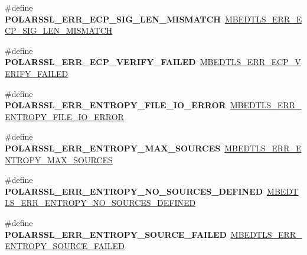 \begin{DoxyCompactItemize}
\item 
\mbox{\label{compat-1_83_8h_a1d2b0f995bf076c5ce5bbc7deb94150c}} 
\#define {\bfseries P\+O\+L\+A\+R\+S\+S\+L\+\_\+\+E\+R\+R\+\_\+\+E\+C\+P\+\_\+\+S\+I\+G\+\_\+\+L\+E\+N\+\_\+\+M\+I\+S\+M\+A\+T\+CH}~\mbox{\hyperlink{ecp_8h_a49d1dece5c167d28f22702cfc11b9aa1}{M\+B\+E\+D\+T\+L\+S\+\_\+\+E\+R\+R\+\_\+\+E\+C\+P\+\_\+\+S\+I\+G\+\_\+\+L\+E\+N\+\_\+\+M\+I\+S\+M\+A\+T\+CH}}
\item 
\mbox{\label{compat-1_83_8h_a250e37c379fd853d666415a8fc308e6e}} 
\#define {\bfseries P\+O\+L\+A\+R\+S\+S\+L\+\_\+\+E\+R\+R\+\_\+\+E\+C\+P\+\_\+\+V\+E\+R\+I\+F\+Y\+\_\+\+F\+A\+I\+L\+ED}~\mbox{\hyperlink{ecp_8h_a3d19895998e4ac7b4744c2407cec1917}{M\+B\+E\+D\+T\+L\+S\+\_\+\+E\+R\+R\+\_\+\+E\+C\+P\+\_\+\+V\+E\+R\+I\+F\+Y\+\_\+\+F\+A\+I\+L\+ED}}
\item 
\mbox{\label{compat-1_83_8h_a348fa499b6e890de696df6b23d9cce39}} 
\#define {\bfseries P\+O\+L\+A\+R\+S\+S\+L\+\_\+\+E\+R\+R\+\_\+\+E\+N\+T\+R\+O\+P\+Y\+\_\+\+F\+I\+L\+E\+\_\+\+I\+O\+\_\+\+E\+R\+R\+OR}~\mbox{\hyperlink{entropy_8h_a356b20cef049a2de3e99909321894463}{M\+B\+E\+D\+T\+L\+S\+\_\+\+E\+R\+R\+\_\+\+E\+N\+T\+R\+O\+P\+Y\+\_\+\+F\+I\+L\+E\+\_\+\+I\+O\+\_\+\+E\+R\+R\+OR}}
\item 
\mbox{\label{compat-1_83_8h_a91eeab75dbfc3730efdc415f57e9f4ac}} 
\#define {\bfseries P\+O\+L\+A\+R\+S\+S\+L\+\_\+\+E\+R\+R\+\_\+\+E\+N\+T\+R\+O\+P\+Y\+\_\+\+M\+A\+X\+\_\+\+S\+O\+U\+R\+C\+ES}~\mbox{\hyperlink{entropy_8h_a12a0600bd163efc21469e406a4e194ce}{M\+B\+E\+D\+T\+L\+S\+\_\+\+E\+R\+R\+\_\+\+E\+N\+T\+R\+O\+P\+Y\+\_\+\+M\+A\+X\+\_\+\+S\+O\+U\+R\+C\+ES}}
\item 
\mbox{\label{compat-1_83_8h_a0b3765116f6d9d1cbdd5d2c4faee5d33}} 
\#define {\bfseries P\+O\+L\+A\+R\+S\+S\+L\+\_\+\+E\+R\+R\+\_\+\+E\+N\+T\+R\+O\+P\+Y\+\_\+\+N\+O\+\_\+\+S\+O\+U\+R\+C\+E\+S\+\_\+\+D\+E\+F\+I\+N\+ED}~\mbox{\hyperlink{entropy_8h_ab9f0a333fbef6d5ebe4fda846249f5c6}{M\+B\+E\+D\+T\+L\+S\+\_\+\+E\+R\+R\+\_\+\+E\+N\+T\+R\+O\+P\+Y\+\_\+\+N\+O\+\_\+\+S\+O\+U\+R\+C\+E\+S\+\_\+\+D\+E\+F\+I\+N\+ED}}
\item 
\mbox{\label{compat-1_83_8h_ab9ff2b3b04c80aa19556ed9676bf35e2}} 
\#define {\bfseries P\+O\+L\+A\+R\+S\+S\+L\+\_\+\+E\+R\+R\+\_\+\+E\+N\+T\+R\+O\+P\+Y\+\_\+\+S\+O\+U\+R\+C\+E\+\_\+\+F\+A\+I\+L\+ED}~\mbox{\hyperlink{entropy_8h_af4cd68e9098b27fed32e7d4a48a4048b}{M\+B\+E\+D\+T\+L\+S\+\_\+\+E\+R\+R\+\_\+\+E\+N\+T\+R\+O\+P\+Y\+\_\+\+S\+O\+U\+R\+C\+E\+\_\+\+F\+A\+I\+L\+ED}}

\end{DoxyCompactItemize}
